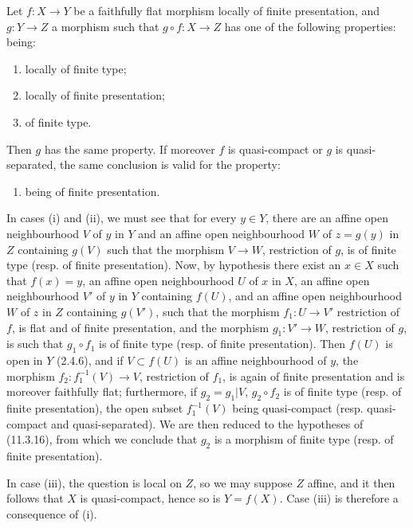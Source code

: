 \begin{lemma}[17.7.5]
\label{IV.17.7.5}
Let $f:X\to Y$ be a faithfully flat morphism locally of finite presentation, and $g:Y\to Z$ a morphism such that $g\circ f:X\to Z$ has one of the following properties: being:
\begin{enumerate}
  \item[\textup{(i)}] locally of finite type;
  \item[\textup{(ii)}] locally of finite presentation;
  \item[\textup{(iii)}] of finite type.
\end{enumerate}
Then $g$ has the same property. If moreover $f$ is quasi-compact or $g$ is quasi-separated, the same conclusion is valid for the property:
\begin{enumerate}
  \item[\textup{(iv)}] being of finite presentation.
\end{enumerate}
\end{lemma}

In cases (i) and (ii), we must see that for every $y\in Y$, there are an affine open neighbourhood $V$ of $y$ in $Y$ and an affine open neighbourhood $W$ of $z=g(y)$ in $Z$ containing $g(V)$ such that the morphism $V\to W$, restriction of $g$, is of finite type (resp. of finite presentation). Now, by hypothesis there exist an $x\in X$ such that $f(x)=y$, an affine open neighbourhood $U$ of $x$ in $X$, an affine open neighbourhood $V'$ of $y$ in $Y$ containing $f(U)$, and an affine open neighbourhood $W$ of $z$ in $Z$ containing $g(V')$, such that the morphism $f_1:U\to V'$ restriction of $f$, is flat and of finite presentation, and the morphism $g_1:V'\to W$, restriction of $g$, is such that $g_1\circ f_1$ is of finite type (resp. of finite presentation). Then $f(U)$ is open in $Y$ (2.4.6), and if $V\subset f(U)$ is an affine neighbourhood of $y$, the morphism $f_2:f_1^{-1}(V)\to V$,
restriction of $f_1$, is again of finite presentation and is moreover faithfully flat; furthermore, if $g_2=g_1|V$, $g_2\circ f_2$ is of finite type (resp. of finite presentation), the open subset $f_1^{-1}(V)$ being quasi-compact (resp. quasi-compact and quasi-separated). We are then reduced to the hypotheses of (11.3.16), from which we conclude that $g_2$ is a morphism of finite type (resp. of finite presentation).

In case (iii), the question is local on $Z$, so we may suppose $Z$ affine, and it then follows that $X$ is quasi-compact, hence so is $Y=f(X)$. Case (iii) is therefore a consequence of (i).

